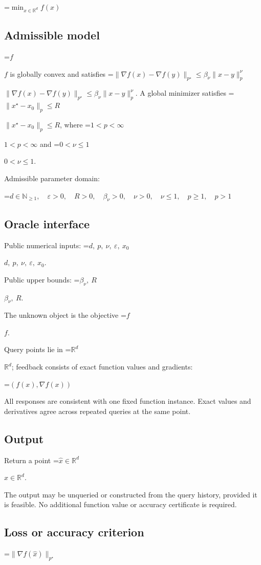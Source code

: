 \documentclass[10pt,a4paper]{article}
\newcommand{\AtlasMath}[1]{\par\begingroup\centering\setbox0=\hbox{$\displaystyle #1$}\ifdim\wd0>1.4\linewidth\typeout{ATLAS WIDE FORMULA: \the\wd0}\fi\ifdim\wd0>\linewidth\resizebox{\linewidth}{!}{\box0}\else\box0\fi\par\endgroup}
\newcommand{\AtlasInlineMath}[1]{\begingroup\setbox0=\hbox{$#1$}\ifdim\wd0>.4\linewidth\endgroup\AtlasMath{#1}\else\endgroup$#1$\fi}
\begin{document}
\AtlasMath{\min_{x\in \mathbb{R}^d}f(x)}


\subsection{Admissible model}
\AtlasInlineMath{f} is globally convex and satisfies \AtlasInlineMath{\|\nabla f(x)-\nabla f(y)\|_{p^\star}\le\beta_\nu\|x-y\|_p^\nu}. A global minimizer satisfies \AtlasInlineMath{\|x^\star-x_0\|_p\le R}, where \AtlasInlineMath{1<p<\infty} and \AtlasInlineMath{0<\nu\le1}.

Admissible parameter domain:


\AtlasMath{d\in\mathbb{N}_{\ge1},\quad \varepsilon>0,\quad R>0,\quad \beta_\nu>0,\quad \nu>0,\quad \nu\le1,\quad p\ge1,\quad p>1}


\subsection{Oracle interface}
Public numerical inputs: \AtlasInlineMath{d,\ p,\ \nu,\ \varepsilon,\ x_0}.

Public upper bounds: \AtlasInlineMath{\beta_\nu,\ R}.

The unknown object is the objective \AtlasInlineMath{f}.

Query points lie in \AtlasInlineMath{\mathbb{R}^d}; feedback consists of exact function values and gradients:


\AtlasMath{(f(x),\nabla f(x))}


All responses are consistent with one fixed function instance. Exact values and derivatives agree across repeated queries at the same point.

\subsection{Output}
Return a point \AtlasInlineMath{\widehat x\in\mathbb R^d}.

The output may be unqueried or constructed from the query history, provided it is feasible. No additional function value or accuracy certificate is required.

\subsection{Loss or accuracy criterion}

\AtlasMath{\|\nabla f(\widehat{x})\|_{p^\star}}
\end{document}
